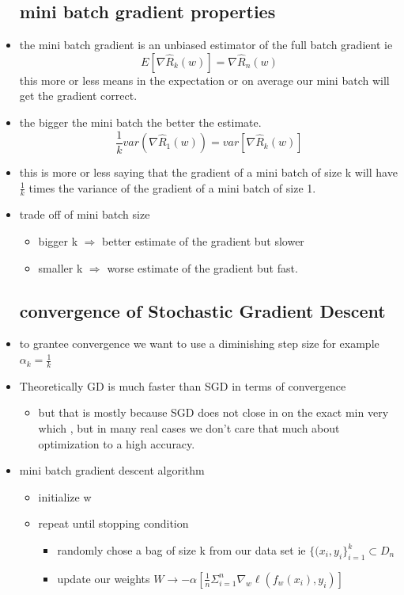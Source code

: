 \documentclass{article}
\begin{document}
\begin{itemize}
\subsection{mini batch gradient properties}
\item the mini batch gradient is an unbiased estimator of the full batch gradient ie $$E[\nabla \hat{R}_{k}(w)]=\nabla \hat{R}_{n}(w)$$ this more or less means in the expectation or on average our mini batch will get the gradient correct.
\item the bigger the mini batch the better the estimate. $$\frac{1}{k}var(\nabla \hat{R}_{1}(w))=var[\nabla \hat{R}_{k}(w)]$$ 
\item this is more or less saying that the gradient of  a mini batch of size k will have $\frac{1}{k}$ times the variance of the gradient of a mini batch of size 1. 
\item trade off of mini batch size
\begin{itemize}
    \item bigger k $\Rightarrow$ better estimate of the gradient but slower
    \item smaller k $\Rightarrow$ worse estimate of the gradient but fast. 
\end{itemize}
\subsection{convergence of Stochastic Gradient Descent }
\item to grantee convergence we want to use a diminishing step size for example $\alpha_{k}=\frac{1}{k}$
\item Theoretically GD is much faster than SGD in terms of convergence 
\begin{itemize}
    \item but that is mostly because SGD does not close in on the exact min very which , but in many real cases we don't care that much about optimization to a high accuracy. 
\end{itemize}
\item mini batch gradient descent algorithm 
\begin{itemize}
    \item initialize w
    \item repeat until stopping condition
    \begin{itemize}
        \item randomly chose a bag of size k from our data set ie $\{(x_i,y_i\}_{i=1}^{k}\subset D_n$ 
        \item update our weights $W\rightarrow - \alpha [\frac{1}{n}\Sigma_{i=1}^{n}\nabla_{w}\ell(f_{w}(x_i),y_i)]$
    \end{itemize}
\end{itemize}

\end{itemize}
\end{document}
